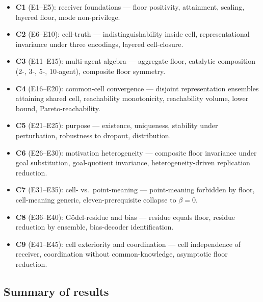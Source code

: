 \documentclass[11pt,a4paper]{article}
\begin{document}
\begin{itemize}[leftmargin=*]
\item \textbf{C1} (E1--E5): receiver foundations --- floor positivity,
attainment, scaling, layered floor, mode non-privilege.
\item \textbf{C2} (E6--E10): cell-truth --- indistinguishability inside
cell, representational invariance under three encodings, layered
cell-closure.
\item \textbf{C3} (E11--E15): multi-agent algebra --- aggregate floor,
catalytic composition (2-, 3-, 5-, 10-agent), composite floor symmetry.
\item \textbf{C4} (E16--E20): common-cell convergence --- disjoint
representation ensembles attaining shared cell, reachability
monotonicity, reachability volume, lower bound, Pareto-reachability.
\item \textbf{C5} (E21--E25): purpose --- existence, uniqueness, stability
under perturbation, robustness to dropout, distribution.
\item \textbf{C6} (E26--E30): motivation heterogeneity --- composite
floor invariance under goal substitution, goal-quotient invariance,
heterogeneity-driven replication reduction.
\item \textbf{C7} (E31--E35): cell- vs.\ point-meaning --- point-meaning
forbidden by floor, cell-meaning generic, eleven-prerequisite
collapse to $\beta=0$.
\item \textbf{C8} (E36--E40): Gödel-residue and bias --- residue equals
floor, residue reduction by ensemble, bias-decoder identification.
\item \textbf{C9} (E41--E45): cell exteriority and coordination ---
cell independence of receiver, coordination without common-knowledge,
asymptotic floor reduction.
\end{itemize}

\subsection{Summary of results}
\end{document}
